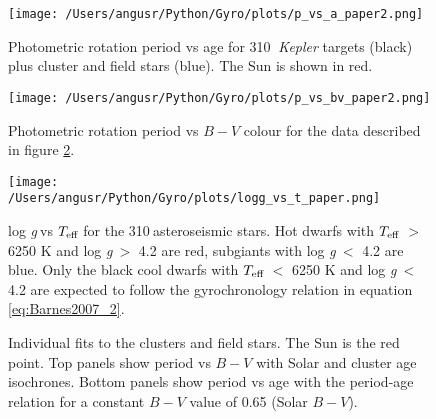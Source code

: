 \documentclass[10pt,preprint]{aastex}
\newcommand{\logg}{log \emph{g}}
\newcommand{\teff}{$T_{\rm{eff}}$}
\newcommand{\nastero}{310}
\begin{document}



\begin{figure}[ht]
\begin{center}
\texttt{[image: /Users/angusr/Python/Gyro/plots/p\_vs\_a\_paper2.png]}
\caption{Photometric rotation period vs age for \nastero$~$ {\it Kepler} targets (black) plus cluster and field stars (blue). The Sun is shown in red.}
\label{fig:p_vs_a}
\end{center}
\end{figure}

\begin{figure}[ht]
\begin{center}
\texttt{[image: /Users/angusr/Python/Gyro/plots/p\_vs\_bv\_paper2.png]}
\caption{Photometric rotation period vs $B-V$ colour for the data described in figure \ref{fig:3d}.}
\label{fig:3d}
\end{center}
\end{figure}

\begin{figure}[ht]
\begin{center}
\texttt{[image: /Users/angusr/Python/Gyro/plots/logg\_vs\_t\_paper.png]}
\caption{\logg$~$vs \teff$~$for the \nastero$~$asteroseismic stars. Hot dwarfs with \teff$~>$ 6250 K and \logg$~>$ 4.2 are red, subgiants with \logg$~<$ 4.2 are blue. Only the black cool dwarfs with \teff$~<$ 6250 K and \logg$~<$ 4.2 are expected to follow the gyrochronology relation in equation \ref{eq:Barnes2007_2}.}
\label{fig:logg_vs_t}
\end{center}
\end{figure}

\begin{figure}[ht]
\begin{center}
    \end{center}
    \caption{ Individual fits to the clusters and field stars. The Sun is the red point. Top panels show period vs $B-V$ with Solar and cluster age isochrones. Bottom panels show period vs age with the period-age relation for a constant $B-V$ value of 0.65 (Solar $B-V$).}
   \label{fig:subfigures2}
\end{figure}
\end{document}
